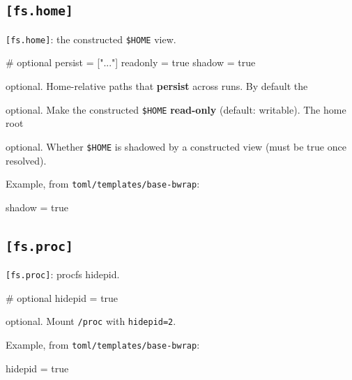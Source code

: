 \hypertarget{fs.home}{%
\subsection{\texorpdfstring{\texttt{{[}fs.home{]}}}{{[}fs.home{]}}}\label{fs.home}}

\texttt{{[}fs.home{]}}: the constructed \texttt{\$HOME} view.

\begin{kennelcode}
[fs.home]
# optional
persist  = ["..."]
readonly = true
shadow   = true
\end{kennelcode}

\begin{description}
\tightlist
\item[\texttt{persist}]
optional. Home-relative paths that \textbf{persist} across runs. By
default the
\item[\texttt{readonly}]
optional. Make the constructed \texttt{\$HOME} \textbf{read-only}
(default: writable). The home root
\item[\texttt{shadow}]
optional. Whether \texttt{\$HOME} is shadowed by a constructed view
(must be true once resolved).
\end{description}

Example, from \texttt{toml/templates/base-bwrap}:

\begin{kennelcode}
[fs.home]
shadow = true
\end{kennelcode}

\hypertarget{fs.proc}{%
\subsection{\texorpdfstring{\texttt{{[}fs.proc{]}}}{{[}fs.proc{]}}}\label{fs.proc}}

\texttt{{[}fs.proc{]}}: procfs hidepid.

\begin{kennelcode}
[fs.proc]
# optional
hidepid  = true
\end{kennelcode}

\begin{description}
\tightlist
\item[\texttt{hidepid}]
optional. Mount \texttt{/proc} with \texttt{hidepid=2}.
\end{description}

Example, from \texttt{toml/templates/base-bwrap}:

\begin{kennelcode}
[fs.proc]
hidepid = true
\end{kennelcode}


